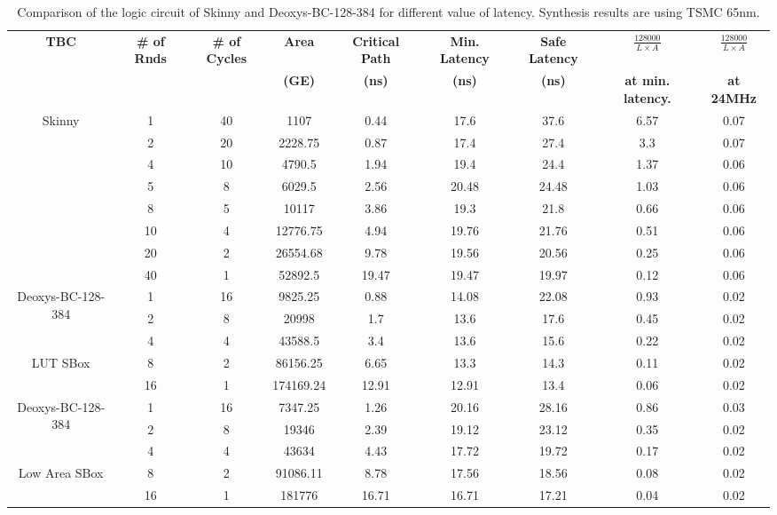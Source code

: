 \documentclass[conference]{IEEEtran}
\begin{document}
\begin{table}[!thb]
\centering
\caption{Comparison of the logic circuit of Skinny and Deoxys-BC-128-384 for different value of latency. Synthesis results are using TSMC 65nm.}\label{tab:comptbc}
\begin{tabular}{c|c|c|c|c|c|c|c|c}\hline
  \multirow{2}{*}{\textbf{TBC}} & \multirow{2}{*}{\textbf{\# of Rnds}} & \multirow{2}{*}{\textbf{\# of Cycles}} & \textbf{Area} & \textbf{Critical Path} & \textbf{Min. Latency} & \textbf{Safe Latency} & \textbf{$\frac{128000}{L\times A}$}  & \textbf{$\frac{128000}{L\times A}$} \\
  & & & \textbf{(GE)} & \textbf{(ns)} & \textbf{(ns)} & \textbf{(ns)} & \textbf{at min. latency.} & \textbf{at 24MHz} \\ \hline \hline
  \multirow{8}{*}{Skinny} &
    1	& 40 & 1107 & 0.44	& 17.6	& 37.6 & 6.57 & 0.07 \\
  & 2	& 20 & 2228.75 & 0.87	& 17.4	& 27.4 & 3.3 & 0.07 \\
  & 4	& 10 & 4790.5 & 1.94	& 19.4	& 24.4 & 1.37 & 0.06 \\ 
  & 5	&  8 & 6029.5 & 2.56	& 20.48	& 24.48 & 1.03 & 0.06 \\
  & 8	&  5 & 10117 & 3.86	& 19.3	& 21.8 & 0.66 & 0.06 \\
  & 10 & 4 & 12776.75 & 4.94	& 19.76	& 21.76 & 0.51 & 0.06 \\
  & 20 & 2 & 26554.68 & 9.78	& 19.56	& 20.56 & 0.25 & 0.06 \\
  & 40 & 1 & 52892.5 & 19.47 & 19.47 & 19.97 & 0.12 & 0.06 \\
    \hline
    \multirow{3}{*}{Deoxys-BC-128-384} &
    1 & 16 & 9825.25& 0.88 & 14.08 & 22.08 & 0.93 & 0.02 \\
    & 2 & 8 & 20998& 1.7 & 13.6 & 17.6 & 0.45 & 0.02 \\
    & 4 & 4 & 43588.5& 3.4 & 13.6 & 15.6 & 0.22 & 0.02 \\
    \multirow{2}{*}{LUT SBox}
    & 8 & 2 & 86156.25& 6.65 & 13.3 & 14.3 & 0.11 & 0.02 \\
    & 16 & 1 & 174169.24& 12.91 & 12.91 & 13.4 & 0.06 & 0.02 \\
    \hline
    \multirow{3}{*}{Deoxys-BC-128-384} &
    1 & 16 & 7347.25& 1.26 & 20.16 & 28.16 & 0.86 & 0.03 \\
    & 2 & 8 & 19346 & 2.39 & 19.12 & 23.12 & 0.35 & 0.02 \\
    & 4 & 4 & 43634 & 4.43 & 17.72 & 19.72 & 0.17 & 0.02 \\
    \multirow{2}{*}{Low Area SBox} 
    & 8 & 2 & 91086.11& 8.78 & 17.56 & 18.56 & 0.08 & 0.02 \\
    & 16 & 1 & 181776 &  16.71 &  16.71 &  17.21 &  0.04 & 0.02 \\ \hline
\end{tabular}
\end{table}
\end{document}
